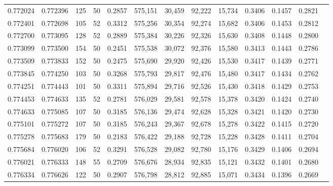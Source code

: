 \begin{tabular}{rrrrrrrrrrrrr}
0.772024 & 0.772396 &   125 &  50 &                                     0.2857 & 575,151 &  30,459 &  92,222 &  15,734 & 0.3406 & 0.1457 & 0.2821 \\
0.772401 & 0.772698 &   105 &  52 &                                     0.3312 & 575,256 &  30,354 &  92,274 &  15,682 & 0.3406 & 0.1453 & 0.2812 \\
0.772700 & 0.773095 &   128 &  52 &                                     0.2889 & 575,384 &  30,226 &  92,326 &  15,630 & 0.3408 & 0.1448 & 0.2800 \\
0.773099 & 0.773500 &   154 &  50 &                                     0.2451 & 575,538 &  30,072 &  92,376 &  15,580 & 0.3413 & 0.1443 & 0.2786 \\
0.773509 & 0.773833 &   152 &  50 &                                     0.2475 & 575,690 &  29,920 &  92,426 &  15,530 & 0.3417 & 0.1439 & 0.2771 \\
0.773845 & 0.774250 &   103 &  50 &                                     0.3268 & 575,793 &  29,817 &  92,476 &  15,480 & 0.3417 & 0.1434 & 0.2762 \\
0.774251 & 0.774443 &   101 &  50 &                                     0.3311 & 575,894 &  29,716 &  92,526 &  15,430 & 0.3418 & 0.1429 & 0.2753 \\
0.774453 & 0.774633 &   135 &  52 &                                     0.2781 & 576,029 &  29,581 &  92,578 &  15,378 & 0.3420 & 0.1424 & 0.2740 \\
0.774633 & 0.775085 &   107 &  50 &                                     0.3185 & 576,136 &  29,474 &  92,628 &  15,328 & 0.3421 & 0.1420 & 0.2730 \\
0.775101 & 0.775272 &   107 &  50 &                                     0.3185 & 576,243 &  29,367 &  92,678 &  15,278 & 0.3422 & 0.1415 & 0.2720 \\
0.775278 & 0.775683 &   179 &  50 &                                     0.2183 & 576,422 &  29,188 &  92,728 &  15,228 & 0.3428 & 0.1411 & 0.2704 \\
0.775684 & 0.776020 &   106 &  52 &                                     0.3291 & 576,528 &  29,082 &  92,780 &  15,176 & 0.3429 & 0.1406 & 0.2694 \\
0.776021 & 0.776333 &   148 &  55 &                                     0.2709 & 576,676 &  28,934 &  92,835 &  15,121 & 0.3432 & 0.1401 & 0.2680 \\
0.776334 & 0.776626 &   122 &  50 &                                     0.2907 & 576,798 &  28,812 &  92,885 &  15,071 & 0.3434 & 0.1396 & 0.2669 \\

\end{tabular}
